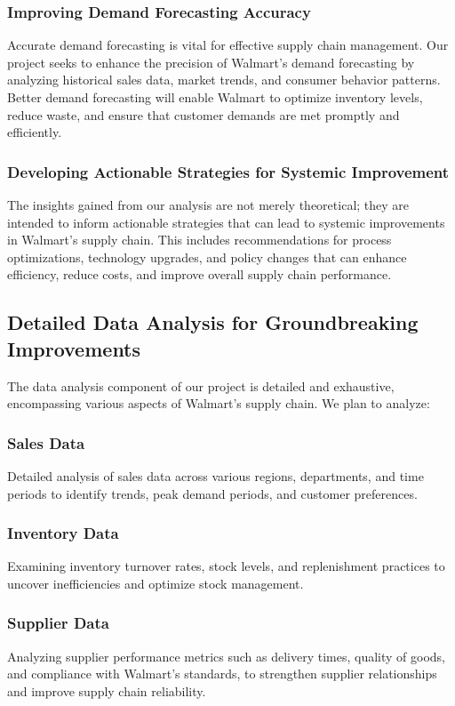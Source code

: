 \documentclass[conference]{IEEEtran}
\begin{document}
\subsubsection{Improving Demand Forecasting Accuracy}
Accurate demand forecasting is vital for effective supply chain management. Our project seeks to enhance the precision of Walmart's demand forecasting by analyzing historical sales data, market trends, and consumer behavior patterns. Better demand forecasting will enable Walmart to optimize inventory levels, reduce waste, and ensure that customer demands are met promptly and efficiently.

\subsubsection{Developing Actionable Strategies for Systemic Improvement}
The insights gained from our analysis are not merely theoretical; they are intended to inform actionable strategies that can lead to systemic improvements in Walmart's supply chain. This includes recommendations for process optimizations, technology upgrades, and policy changes that can enhance efficiency, reduce costs, and improve overall supply chain performance.

\subsection{Detailed Data Analysis for Groundbreaking Improvements}
The data analysis component of our project is detailed and exhaustive, encompassing various aspects of Walmart's supply chain. We plan to analyze:

\subsubsection{Sales Data}
Detailed analysis of sales data across various regions, departments, and time periods to identify trends, peak demand periods, and customer preferences.

\subsubsection{Inventory Data}
Examining inventory turnover rates, stock levels, and replenishment practices to uncover inefficiencies and optimize stock management.

\subsubsection{Supplier Data}
Analyzing supplier performance metrics such as delivery times, quality of goods, and compliance with Walmart’s standards, to strengthen supplier relationships and improve supply chain reliability.
\end{document}
